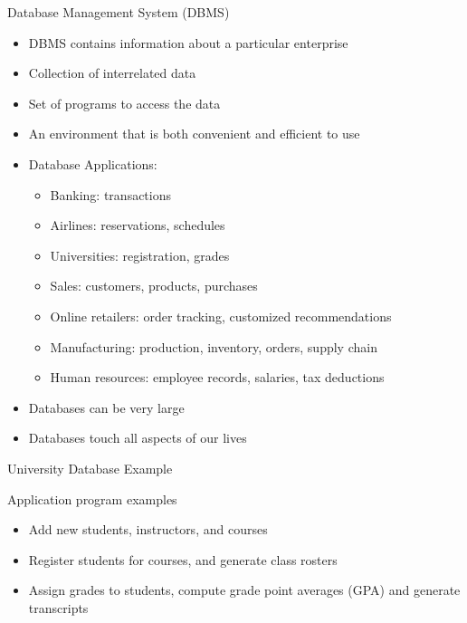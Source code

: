 \documentclass[aspectratio=169, xcolor=dvipsnames]{beamer}
\begin{document}
\begin{frame}{Database Management System (DBMS)}
    \begin{itemize}[<+->]
        \item DBMS contains information about a particular enterprise
        \item Collection of interrelated data
        \item Set of programs to access the data
        \item An environment that is both convenient and efficient to use
        \item Database Applications:
        \begin{itemize}
            \item Banking: transactions
            \item Airlines: reservations, schedules
            \item Universities: registration, grades
            \item Sales: customers, products, purchases
            \item Online retailers: order tracking, customized recommendations
            \item Manufacturing: production, inventory, orders, supply chain
            \item Human resources: employee records, salaries, tax deductions
        \end{itemize}
        \item Databases can be very large
        \item Databases touch all aspects of our lives
    \end{itemize}
\end{frame}

\begin{frame}{University Database Example}
    \begin{exampleblock}{Application program examples}
        \begin{itemize}[<+->]
            \item Add new students, instructors, and courses
            \item Register students for courses, and generate class rosters
            \item Assign grades to students, compute grade point averages (GPA) and generate transcripts
        \end{itemize}
    \end{exampleblock}
    
\end{frame}
\end{document}
